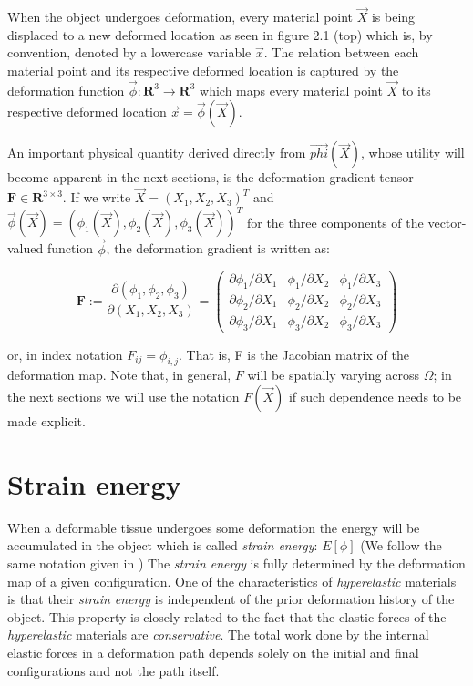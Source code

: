 When the object undergoes deformation, every material point $\vec{X}$ is being displaced to a new deformed location as seen in figure 2.1 (top) which is, 
by convention, denoted by a lowercase variable $\vec{x}$. The relation between each material point and its respective deformed location is captured by 
the deformation function $\vec{\phi} : \mathbf{R}^3 \rightarrow \mathbf{R}^3$ which maps every material point $\vec{X}$ to its respective deformed 
location $\vec{x}=\vec{\phi}(\vec{X})$.

An important physical quantity derived directly from $\vec{phi}(\vec{X})$, whose utility will become apparent in the next sections, is the deformation 
gradient tensor $\mathbf{F} \in \mathbf{R}^{3 \times 3}$. If we write $\vec{X} =(X_1,X_2,X_3)^T $ and 
$\vec{\phi}(\vec{X})=(\phi_1(\vec{X}), \phi_2(\vec{X}), \phi_3(\vec{X}))^T$ for the three components of the vector-valued function $\vec{\phi}$,
the deformation gradient is written as: 

\begin{equation}
 \mathbf{F} := \frac{\partial(\phi_1, \phi_2, \phi_3)}{\partial (X_1, X_2, X_3)}= 
 \left(\begin{array}{ccc} 
      \partial \phi_1/\partial X_1 & \phi_1/\partial X_2 & \phi_1/\partial X_3 \\
      \partial \phi_2/\partial X_1 & \phi_2/\partial X_2 & \phi_2/\partial X_3 \\
      \partial \phi_3/\partial X_1 & \phi_3/\partial X_2 & \phi_3/\partial X_3 
      \end{array} \right)
\end{equation}



or, in index notation $F_{ij} = \phi_{i,j}$. That is, F is the Jacobian matrix of the deformation map. Note that, in general, $F$ will be spatially varying 
across $\Omega$; in the next sections we will use the notation $F(\vec{X})$ if such dependence needs to be made explicit.

\section{Strain energy}
When a deformable tissue undergoes some deformation the energy will be accumulated in the object which is called \textit{strain energy}: $E[\phi]$ (We 
follow the same notation given in \cite{Sifakis2012}) The \textit{strain energy} is fully determined by the deformation map of a given configuration.
One of the characteristics of \textit{hyperelastic} materials is that their \textit{strain energy} is independent of the prior deformation history 
of the object. This property is closely related to the fact that the elastic forces of the \textit{hyperelastic} materials are \textit{conservative}.
The total work done by the internal elastic forces in a deformation path depends solely on the initial and final configurations and not the path itself.

